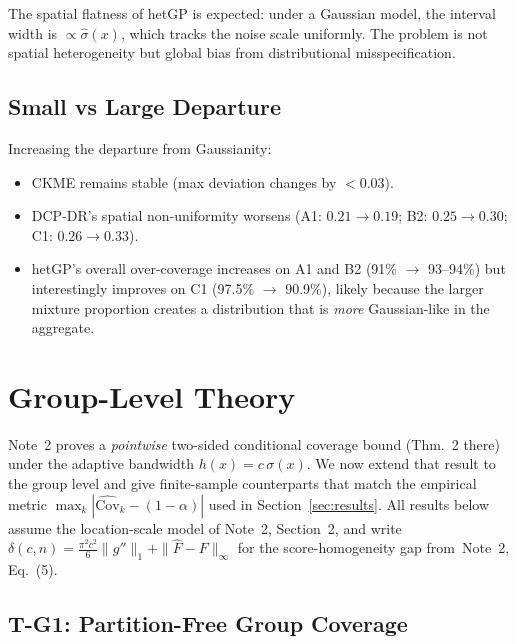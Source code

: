 \documentclass[11pt]{article}
\theoremstyle{remark}
\begin{document}
The spatial flatness of hetGP is expected: under a Gaussian model,
the interval width is $\propto \hat\sigma(x)$, which tracks the
noise scale uniformly. The problem is not spatial heterogeneity but
global bias from distributional misspecification.

\subsection{Small vs Large Departure}

Increasing the departure from Gaussianity:
\begin{itemize}
  \item CKME remains stable (max deviation changes by $< 0.03$).
  \item DCP-DR's spatial non-uniformity worsens
    (A1: $0.21 \to 0.19$; B2: $0.25 \to 0.30$; C1: $0.26 \to 0.33$).
  \item hetGP's overall over-coverage increases on A1 and B2
    (91\% $\to$ 93--94\%) but interestingly improves on C1
    (97.5\% $\to$ 90.9\%), likely because the larger mixture
    proportion creates a distribution that is \emph{more} Gaussian-like
    in the aggregate.
\end{itemize}


\section{Group-Level Theory}
\label{sec:group-theory}

Note~2 proves a \emph{pointwise} two-sided conditional coverage bound
(Thm.~2 there) under the adaptive bandwidth $h(x) = c\,\sigma(x)$.
We now extend that result to the group level and give finite-sample
counterparts that match the empirical metric
$\max_k |\widehat{\mathrm{Cov}}_k - (1-\alpha)|$ used in
Section~\ref{sec:results}. All results below assume the location-scale
model of Note~2, Section~2, and write
$\delta(c,n) = \tfrac{\pi^2 c^2}{6}\|g''\|_1 + \|\hat F - F\|_\infty$
for the score-homogeneity gap from~Note~2, Eq.~(5).

\subsection{T-G1: Partition-Free Group Coverage}
\label{sec:tg1}
\end{document}
